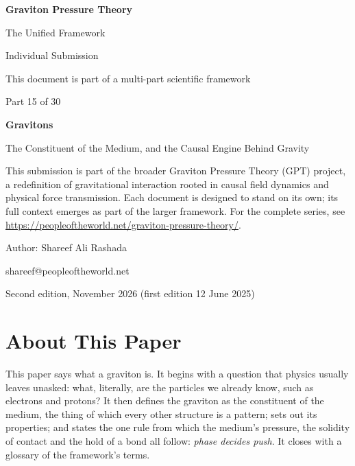\documentclass[11pt,a4paper]{article}
\begin{document}
\renewcommand{\thetable}{15.\arabic{table}}
\begin{titlepage}
\centering
\vspace*{1.5cm}
{\Huge\bfseries Graviton Pressure Theory\par}
\vspace{0.4cm}
{\Large The Unified Framework\par}
{\large Individual Submission\par}
\vspace{0.3cm}
{\normalsize This document is part of a multi-part scientific framework\par}
\vspace{1.6cm}
{\large Part 15 of 30\par}
\vspace{0.6cm}
{\huge\bfseries Gravitons\par}
\vspace{0.5cm}
{\Large The Constituent of the Medium, and the Causal Engine Behind Gravity\par}
\vspace{1.4cm}
\begin{minipage}{0.82\textwidth}\centering\small
This submission is part of the broader Graviton Pressure Theory (GPT) project, a redefinition of gravitational interaction rooted in causal field dynamics and physical force transmission. Each document is designed to stand on its own; its full context emerges as part of the larger framework. For the complete series, see \url{https://peopleoftheworld.net/graviton-pressure-theory/}.
\end{minipage}
\vfill
{\large Author: Shareef Ali Rashada\par}
{\normalsize shareef@peopleoftheworld.net\par}
\vspace{0.3cm}
{\normalsize Second edition, November 2026 \quad (first edition 12 June 2025)\par}
\end{titlepage}

\tableofcontents
\newpage

\section*{About This Paper}

This paper says what a graviton is. It begins with a question that physics usually leaves unasked: what, literally, are the particles we already know, such as electrons and protons? It then defines the graviton as the constituent of the medium, the thing of which every other structure is a pattern; sets out its properties; and states the one rule from which the medium's pressure, the solidity of contact and the hold of a bond all follow: \emph{phase decides push}. It closes with a glossary of the framework's terms.
\end{document}
